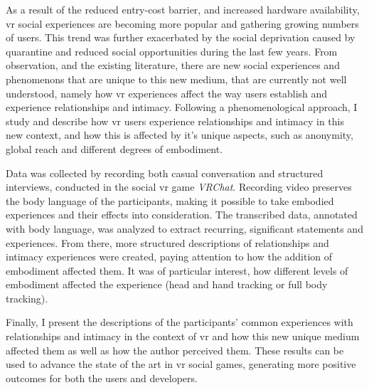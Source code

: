 



As a result of the reduced entry-cost barrier, and increased hardware availability, \Gls{vr} social experiences are becoming more popular and gathering growing numbers of users.
This trend was further exacerbated by the social deprivation caused by quarantine and reduced social opportunities during the last few years. 
From observation, and the existing literature, there are new social experiences and phenomenons that are unique to this new medium, that are currently not well understood, namely how \gls{vr} experiences affect the way users establish and experience relationships and intimacy. 
Following a phenomenological approach, I study and describe how \gls{vr} users experience relationships and intimacy in this new context, and how this is affected by it's unique aspects, such as anonymity, global reach and different degrees of embodiment.

Data was collected by recording both casual conversation and structured interviews, conducted in the social \gls{vr} game \emph{VRChat}.
Recording video preserves the body language of the participants, making it possible to take embodied experiences and their effects into consideration. 
The transcribed data, annotated with body language, was analyzed to extract recurring, significant statements and experiences.
From there, more structured descriptions of relationships and intimacy experiences were created, paying attention to how the addition of embodiment affected them. It was of particular interest, how different levels of embodiment affected the experience (\eg head and hand tracking or full body tracking).

Finally, I present the descriptions of the participants' common experiences with relationships and intimacy in the context of \gls{vr} and how this new unique medium affected them as well as how the author perceived them.
These results can be used to advance the state of the art in \gls{vr} social games, generating more positive outcomes for both the users and developers.




